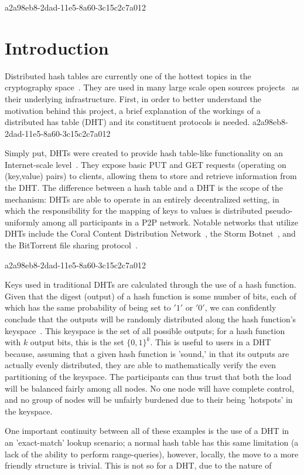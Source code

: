 \documentclass[12pt]{article}
\begin{document}
a2a98eb8-2dad-11e5-8a60-3c15c2c7a012\section{Introduction}
\par Distributed hash tables are currently one of the hottest topics in the cryptography space~\cite{Stoica:2001dj,Rowstron:2001ea,Ratnasamy:2001wn}. They are used in many large scale open sources projects~\cite{Freitas:2013tb,Xu:2010vs,Perfitt:2010fh} as their underlying infrastructure. First, in order to better understand the motivation behind this project, a brief explanation of the workings of a distributed has table (DHT) and its constituent protocols is needed.
a2a98eb8-2dad-11e5-8a60-3c15c2c7a012
\par Simply put, DHTs were created to provide hash table-like functionality on an Internet-scale level~\cite{Ratnasamy:2001wn}. They expose basic PUT and GET requests (operating on (key,value) pairs) to clients, allowing them to store and retrieve information from the DHT. The difference between a hash table and a DHT is the scope of the mechanism: DHTs are able to operate in an entirely decentralized setting, in which the responsibility for the mapping of keys to values is distributed pseudo-uniformly among all participants in a P2P network. Notable networks that utilize DHTs include the Coral Content Distribution Network~\cite{Freedman:2004vb}, the Storm Botnet~\cite{Holz:2008uk}, and the BitTorrent file sharing protocol~\cite{Cohen:y1_8mBnw}.

a2a98eb8-2dad-11e5-8a60-3c15c2c7a012\par Keys used in traditional DHTs are calculated through the use of a hash function. Given that the digest (output) of a hash function is some number of bits, each of which has the same probability of being set to $'1'$ or $'0'$, we can confidently conclude that the outputs will be randomly distributed along the hash function's keyspace~. This keyspace is the set of all possible outputs; for a hash function with $k$ output bits, this is the set $\{0,1\}^k$. This is useful to users in a DHT because, assuming that a given hash function is 'sound,' in that its outputs are actually evenly distributed, they are able to mathematically verify the even partitioning of the keyspace. The participants can thus trust that both the load will be balanced fairly among all nodes. No one node will have complete control, and no group of nodes will be unfairly burdened due to their being 'hotspots' in the keyspace.~

\par One important continuity between all of these examples is the use of a DHT in an 'exact-match' lookup scenario; a normal hash table has this same limitation (a lack of the ability to perform range-queries), however, locally, the move to a more friendly structure is trivial. This is not so for a DHT, due to the nature of
\printbibliography
\end{document}
